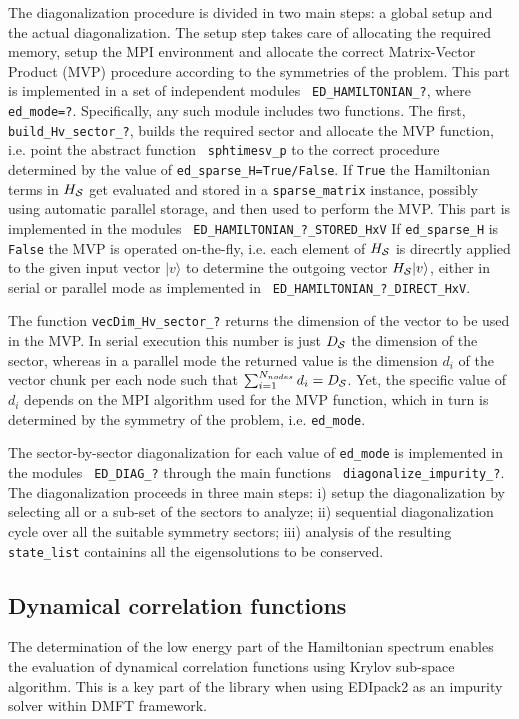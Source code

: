 \documentclass[final,3p,10pt]{elsarticle}
\newcommand{\ket}[1]
{|#1\rangle}
\def\NAME{{\rm EDIpack2 }}
\begin{document}
The diagonalization procedure is divided in two main steps: a global
setup and the actual diagonalization.
%
The setup step takes care of allocating the required memory,
setup the MPI environment and allocate the correct 
Matrix-Vector Product (MVP) procedure according to the symmetries of
the problem. 
This part is implemented in a set of independent modules  {\tt
  ED\_HAMILTONIAN\_?}, where {\tt ed\_mode=?}.
Specifically, any such module includes two functions.
The first, {\tt  build\_Hv\_sector\_?}, builds the required sector and
allocate the MVP function, i.e. point the abstract function {\tt
  sphtimesv\_p} to the correct procedure determined by the value of
{\tt ed\_sparse\_H=True/False}.
If {\tt True} the Hamiltonian terms in $H_{\cal S}$
get evaluated and stored in a {\tt sparse\_matrix} instance, possibly
using automatic parallel storage, and then used to perform
the MVP. This part is implemented in the modules {\tt
  ED\_HAMILTONIAN\_?\_STORED\_HxV}
If {\tt ed\_sparse\_H} is {\tt False} the MVP is operated on-the-fly,
i.e. each element of $H_{\cal S}$ is direcrtly applied to the given input
vector $\ket{v}$ to determine the outgoing vector $H_\SS\ket{v}$,
either in serial or parallel mode as implemented in {\tt
  ED\_HAMILTONIAN\_?\_DIRECT\_HxV}.  



The function {\tt vecDim\_Hv\_sector\_?} returns the 
dimension of the vector to be used in the
MVP. In serial execution this number is just $D_{\cal S}$ the dimension of
the sector, whereas in a parallel mode the returned value is the
dimension $d_i$ of the vector chunk per each node such that
$\sum_{i=1}^{N_{nodes}}d_i = D_{\cal S}$. Yet, the specific value of $d_i$
depends on the MPI algorithm used for the MVP function, which in turn
is determined by the symmetry of the problem, i.e. {\tt ed\_mode}.


The sector-by-sector diagonalization for each
value of {\tt ed\_mode} is implemented in the modules {\tt
  ED\_DIAG\_?} through the main functions {\tt
  diagonalize\_impurity\_?}. The diagonalization proceeds in three main
steps: i) setup the diagonalization by selecting all or a sub-set of the
sectors to analyze; ii) sequential diagonalization cycle over all the suitable symmetry
sectors; iii) analysis of the resulting {\tt state\_list} containins
all the eigensolutions to be conserved.




\subsection{Dynamical correlation functions}\label{sSecGF}
The determination of the low energy part of the Hamiltonian spectrum
enables the evaluation of dynamical correlation functions using Krylov
sub-space algorithm.
This is a key part of the library when using \NAME as an impurity
solver within DMFT framework. 
\end{document}
